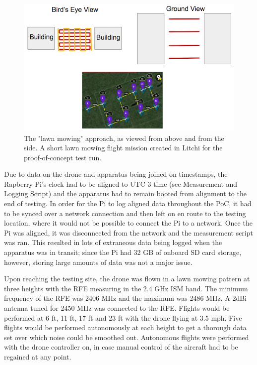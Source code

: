 \documentclass[pageno]{jpaper}
\begin{document}
\begin{figure}[h]
	\caption{The "lawn mowing" approach, as viewed from above and from the side. A short lawn mowing flight mission created in Litchi for the proof-of-concept test run.}
	\includegraphics{lawn_mow_PoC}
	\centering
\end{figure}

Due to data on the drone and apparatus being joined on timestamps, the Rapberry Pi's clock had to be aligned to UTC-3 time (see Measurement and Logging Script) and the apparatus had to remain booted from alignment to the end of testing. In order for the Pi to log aligned data throughout the PoC, it had to be synced over a network connection and then left on en route to the testing location, where it would not be possible to connect the Pi to a network. Once the Pi was aligned, it was disconnected from the network and the measurement script was ran. This resulted in lots of extraneous data being logged when the apparatus was in transit; since the Pi had 32 GB of onboard SD card storage, however, storing large amounts of data was not a major issue. 

Upon reaching the testing site, the drone was flown in a lawn mowing pattern at three heights with the RFE measuring in the 2.4 GHz ISM band. The minimum frequency of the RFE was 2406 MHz and the maximum was 2486 MHz. A 2dBi antenna tuned for 2450 MHz was connected to the RFE. Flights would be performed at 6 ft, 11 ft, 17 ft and 23 ft with the drone flying at 3.5 mph. Five flights would be performed autonomously at each height to get a thorough data set over which noise could be smoothed out. Autonomous flights were performed with the drone controller on, in case manual control of the aircraft had to be regained at any point.
\end{document}
